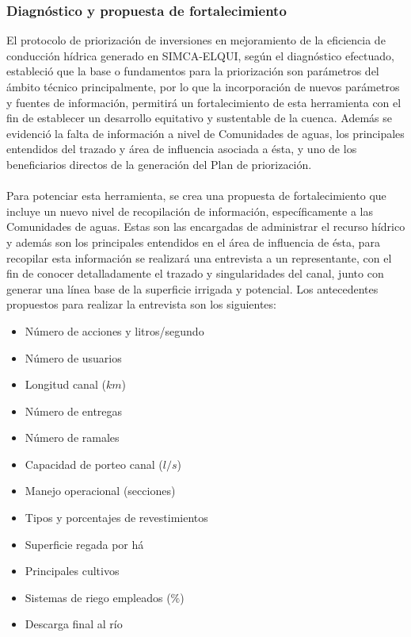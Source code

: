 \documentclass[]{article}
\begin{document}
\subsubsection{Diagnóstico y propuesta de fortalecimiento}

El protocolo de priorización de inversiones en mejoramiento de la eficiencia de conducción hídrica generado en SIMCA-ELQUI, según el diagnóstico efectuado, estableció que la base o fundamentos para la priorización son parámetros del ámbito técnico principalmente, por lo que la incorporación de nuevos parámetros y fuentes de información, permitirá un fortalecimiento de esta herramienta con el fin de establecer un desarrollo equitativo y sustentable de la cuenca. Además se evidenció la falta de información a nivel de Comunidades de aguas, los principales entendidos del trazado y área de influencia asociada a ésta, y uno de los beneficiarios directos de la generación del Plan de priorización.\\
\\
Para potenciar esta herramienta, se crea una propuesta de fortalecimiento que incluye un nuevo nivel de recopilación de información, específicamente a las Comunidades de aguas. Estas son las encargadas de administrar el recurso hídrico y además son los principales entendidos en el área de influencia de ésta, para recopilar esta información se realizará una entrevista a un representante, con el fin de conocer detalladamente el trazado y singularidades del canal, junto con generar una línea base de la superficie irrigada y potencial. Los antecedentes propuestos para realizar la entrevista son los siguientes:

\begin{itemize}
\item Número de acciones y litros/segundo
\item Número de usuarios
\item Longitud canal ($km$)
\item Número de entregas
\item Número de ramales
\item Capacidad de porteo canal ($l/s$)
\item Manejo operacional (secciones)
\item Tipos y porcentajes de revestimientos
\item Superficie regada por há
\item Principales cultivos
\item Sistemas de riego empleados ($\%$)
\item Descarga final al río
\end{itemize}
\end{document}
